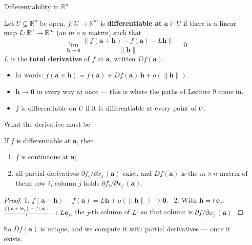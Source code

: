 \documentclass[10pt]{wosm-slides}
\newcommand{\R}{\mathbb{R}}
\newcommand{\norm}[1]{\lVert #1 \rVert}
\newcommand{\va}{\mathbf{a}}
\newcommand{\vh}{\mathbf{h}}
\begin{document}
\begin{frame}{Differentiability in $\R^n$}
  \begin{definition}
    Let $U \subseteq \R^n$ be open. $f\colon U \to \R^m$ is \textbf{differentiable at} $\va \in U$
    if there is a linear map $L\colon \R^n \to \R^m$ (an $m \times n$ matrix) such that
    \[ \lim_{\vh \to \mathbf{0}} \frac{\norm{f(\va + \vh) - f(\va) - L\vh}}{\norm{\vh}} = 0 . \]
    $L$ is the \textbf{total derivative} of $f$ at $\va$, written $Df(\va)$.
  \end{definition}
  \pause
  \begin{itemize}
    \item In words: $f(\va + \vh) = f(\va) + Df(\va)\,\vh + o(\norm{\vh})$.
    \item $\vh \to \mathbf{0}$ in every way at once --- this is where the paths of Lecture 9 come in.
    \item $f$ is differentiable on $U$ if it is differentiable at every point of $U$.
  \end{itemize}
\end{frame}

\begin{frame}{What the derivative must be}
  \begin{theorem}
    If $f$ is differentiable at $\va$, then
    \begin{enumerate}
      \item $f$ is continuous at $\va$;
      \item all partial derivatives $\partial f_i / \partial x_j\,(\va)$ exist, and $Df(\va)$ is the
        $m \times n$ matrix of them: row $i$, column $j$ holds $\partial f_i / \partial x_j\,(\va)$.
    \end{enumerate}
  \end{theorem}
  \pause
  \begin{proof}
    1. $f(\va + \vh) - f(\va) = L\vh + o(\norm{\vh}) \to \mathbf{0}$.
    \ 2. With $\vh = t\,\mathbf{e}_j$:
    $\frac{f(\va + t\mathbf{e}_j) - f(\va)}{t} \to L\mathbf{e}_j$, the $j$-th column of $L$;
    so that column is $\partial f / \partial x_j\,(\va)$.
  \end{proof}
  {\small So $Df(\va)$ is unique, and we compute it with partial derivatives --- once it exists.\par}
\end{frame}
\end{document}
